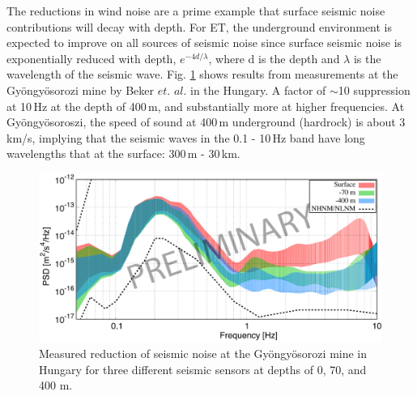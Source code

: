 The reductions in wind noise are a prime example that surface seismic noise contributions will decay with depth. For ET, the underground environment is expected to improve on all sources of seismic noise since surface seismic noise is exponentially reduced with depth, $e^{-4d /\lambda}$, where d is the depth and $\lambda$ is the wavelength of the seismic wave. Fig. \ref{fig3.6} shows results from measurements at the Gy\"ongy\"osorozi mine by Beker $et$. $al$. in the Hungary. A factor of $\sim$10 suppression at 10\,Hz at the depth of 400\,m, and substantially more at higher frequencies. At Gy\"ongy\"osoroszi, the speed of sound at 400\,m underground (hardrock) is about 3\,km/s, implying that the seismic waves in the 0.1 - 10\,Hz band have long wavelengths that at the surface: 300\,m - 30\,km.
\begin{figure}[h!]
	\begin{center}
		 \includegraphics[width=15cm]{./Sec_SiteInfra/Figures/Hung_transparent2.pdf}
		\caption{Measured reduction of seismic noise at the Gy\"ongy\"osorozi mine in Hungary for three different seismic sensors at depths of 0, 70, and 400 m.}
		\label{fig3.6}
	\end{center}
\end{figure}

\FloatBarrier
